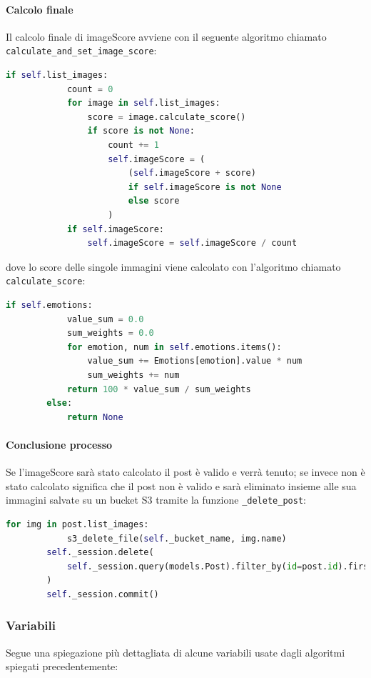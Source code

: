 \paragraph{Calcolo finale} \aCapo{}
Il calcolo finale di imageScore avviene con il seguente algoritmo chiamato \verb+calculate_and_set_image_score+: 
\begin{lstlisting}[language=Python]
        if self.list_images:
            count = 0
            for image in self.list_images:
                score = image.calculate_score()
                if score is not None:
                    count += 1
                    self.imageScore = (
                        (self.imageScore + score)
                        if self.imageScore is not None
                        else score
                    )
            if self.imageScore:
                self.imageScore = self.imageScore / count
\end{lstlisting}
dove lo score delle singole immagini viene calcolato con l'algoritmo chiamato \verb+calculate_score+:
\begin{lstlisting}[language=Python]
        if self.emotions:
            value_sum = 0.0
            sum_weights = 0.0
            for emotion, num in self.emotions.items():
                value_sum += Emotions[emotion].value * num
                sum_weights += num
            return 100 * value_sum / sum_weights
        else:
            return None
\end{lstlisting}
\paragraph{Conclusione processo} \aCapo{}
Se l'imageScore sarà stato calcolato il post è valido e verrà tenuto; se invece non è stato calcolato significa che il post non è valido e sarà eliminato insieme alle sua immagini salvate su un bucket S3 tramite la funzione \verb+_delete_post+:
\begin{lstlisting}[language=Python]
        for img in post.list_images:
            s3_delete_file(self._bucket_name, img.name)
        self._session.delete(
            self._session.query(models.Post).filter_by(id=post.id).first()
        )
        self._session.commit()
\end{lstlisting}
\subsubsection{Variabili}
Segue una spiegazione più dettagliata di alcune variabili usate dagli algoritmi spiegati precedentemente:
